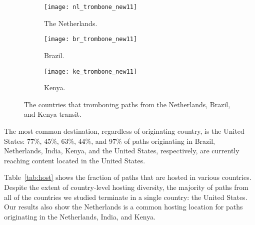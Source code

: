 \begin{figure*}[t!]
\begin{minipage}{\linewidth}
\begin{subfigure}[b]{.32\linewidth}
\texttt{[image: nl\_trombone\_new11]}
\caption{The Netherlands.\label{fig:trombone_netherlands}}
\end{subfigure}
\begin{subfigure}[b]{.32\linewidth}
\texttt{[image: br\_trombone\_new11]}
\caption{Brazil.\label{fig:trombone_brazil}}
\end{subfigure}
\begin{subfigure}[b]{.32\linewidth}
\texttt{[image: ke\_trombone\_new11]}
\caption{Kenya.\label{fig:trombone_kenya}}
\end{subfigure}
\end{minipage}
\caption{The countries that tromboning paths from the Netherlands, Brazil, and Kenya transit.}
\label{fig:trombone}
\end{figure*}



\begin{finding}
The most common destination, regardless of originating country, is the United States:
77\%, 45\%, 63\%, 44\%, and 97\% of paths originating in Brazil, Netherlands, India,
Kenya,
and the United States, respectively, are currently reaching content located in the
United States.
\end{finding}
\noindent
Table~\ref{tab:host} shows the fraction of paths that are hosted in various
countries.  Despite the extent of country-level hosting diversity, the
majority of paths from all of the countries we studied terminate in a single
country: the United States.   Our results also
show the Netherlands is a common hosting location for paths originating in the
Netherlands, India, and Kenya.



